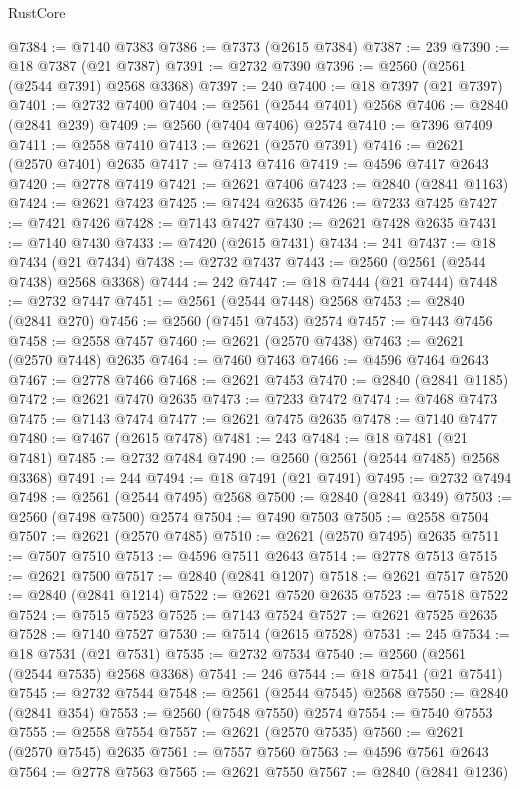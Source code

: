 \begin{lexlean}{RustCore}
\begin{coremodule}
@7384 := @7140 @7383
@7386 := @7373 (@2615 @7384)
@7387 := 239
@7390 := @18 @7387 (@21 @7387)
@7391 := @2732 @7390
@7396 := @2560 (@2561 (@2544 @7391) @2568 @3368)
@7397 := 240
@7400 := @18 @7397 (@21 @7397)
@7401 := @2732 @7400
@7404 := @2561 (@2544 @7401) @2568
@7406 := @2840 (@2841 @239)
@7409 := @2560 (@7404 @7406) @2574
@7410 := @7396 @7409
@7411 := @2558 @7410
@7413 := @2621 (@2570 @7391)
@7416 := @2621 (@2570 @7401) @2635
@7417 := @7413 @7416
@7419 := @4596 @7417 @2643
@7420 := @2778 @7419
@7421 := @2621 @7406
@7423 := @2840 (@2841 @1163)
@7424 := @2621 @7423
@7425 := @7424 @2635
@7426 := @7233 @7425
@7427 := @7421 @7426
@7428 := @7143 @7427
@7430 := @2621 @7428 @2635
@7431 := @7140 @7430
@7433 := @7420 (@2615 @7431)
@7434 := 241
@7437 := @18 @7434 (@21 @7434)
@7438 := @2732 @7437
@7443 := @2560 (@2561 (@2544 @7438) @2568 @3368)
@7444 := 242
@7447 := @18 @7444 (@21 @7444)
@7448 := @2732 @7447
@7451 := @2561 (@2544 @7448) @2568
@7453 := @2840 (@2841 @270)
@7456 := @2560 (@7451 @7453) @2574
@7457 := @7443 @7456
@7458 := @2558 @7457
@7460 := @2621 (@2570 @7438)
@7463 := @2621 (@2570 @7448) @2635
@7464 := @7460 @7463
@7466 := @4596 @7464 @2643
@7467 := @2778 @7466
@7468 := @2621 @7453
@7470 := @2840 (@2841 @1185)
@7472 := @2621 @7470 @2635
@7473 := @7233 @7472
@7474 := @7468 @7473
@7475 := @7143 @7474
@7477 := @2621 @7475 @2635
@7478 := @7140 @7477
@7480 := @7467 (@2615 @7478)
@7481 := 243
@7484 := @18 @7481 (@21 @7481)
@7485 := @2732 @7484
@7490 := @2560 (@2561 (@2544 @7485) @2568 @3368)
@7491 := 244
@7494 := @18 @7491 (@21 @7491)
@7495 := @2732 @7494
@7498 := @2561 (@2544 @7495) @2568
@7500 := @2840 (@2841 @349)
@7503 := @2560 (@7498 @7500) @2574
@7504 := @7490 @7503
@7505 := @2558 @7504
@7507 := @2621 (@2570 @7485)
@7510 := @2621 (@2570 @7495) @2635
@7511 := @7507 @7510
@7513 := @4596 @7511 @2643
@7514 := @2778 @7513
@7515 := @2621 @7500
@7517 := @2840 (@2841 @1207)
@7518 := @2621 @7517
@7520 := @2840 (@2841 @1214)
@7522 := @2621 @7520 @2635
@7523 := @7518 @7522
@7524 := @7515 @7523
@7525 := @7143 @7524
@7527 := @2621 @7525 @2635
@7528 := @7140 @7527
@7530 := @7514 (@2615 @7528)
@7531 := 245
@7534 := @18 @7531 (@21 @7531)
@7535 := @2732 @7534
@7540 := @2560 (@2561 (@2544 @7535) @2568 @3368)
@7541 := 246
@7544 := @18 @7541 (@21 @7541)
@7545 := @2732 @7544
@7548 := @2561 (@2544 @7545) @2568
@7550 := @2840 (@2841 @354)
@7553 := @2560 (@7548 @7550) @2574
@7554 := @7540 @7553
@7555 := @2558 @7554
@7557 := @2621 (@2570 @7535)
@7560 := @2621 (@2570 @7545) @2635
@7561 := @7557 @7560
@7563 := @4596 @7561 @2643
@7564 := @2778 @7563
@7565 := @2621 @7550
@7567 := @2840 (@2841 @1236)

\end{coremodule}
\end{lexlean}
